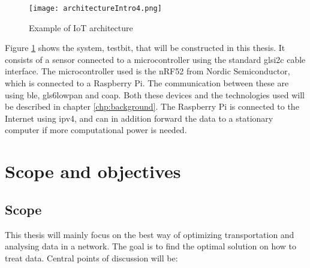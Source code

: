 \begin{figure}[ht]
    \centering
    \texttt{[image: architectureIntro4.png]}    
    \caption{Example of IoT architecture}
    \label{iotExampleArchitecture}
\end{figure}

\noindent Figure \ref{iotExampleArchitecture} shows the system, testbit, that will be constructed in this thesis. It consists of a sensor connected to a \gls{microcontroller} using the standard gls{i2c} cable interface. The \gls{microcontroller} used is the \gls{nRF52} from Nordic Semiconductor, which is connected to a \gls{Raspberry Pi}. The communication between these are using \gls{ble}, gls{6lowpan} and \gls{coap}. Both these devices and the technologies used will be described in chapter \ref{chp:background}. The \gls{Raspberry Pi} is connected to the Internet using \gls{ipv4}, and can in addition forward the data to a stationary computer if more computational power is needed. 












\section{Scope and objectives}

\subsection{Scope}

\noindent This thesis will mainly focus on the best way of optimizing transportation and analysing data in a network. The goal is to find the optimal solution on how to treat data. Central points of discussion will be:

